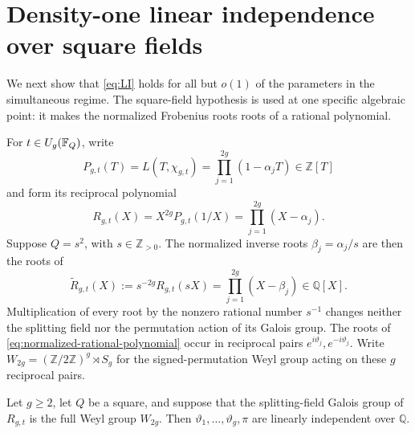 \section{Density-one linear independence over square fields}
\label{sec:linear-independence}

We next show that \eqref{eq:LI} holds for all but \(o(1)\) of the parameters
in the simultaneous regime.  The square-field hypothesis is used at one
specific algebraic point: it makes the normalized Frobenius roots roots of a
rational polynomial.

For \(t\in U_g(\mathbb F_Q)\), write
\[
 P_{g,t}(T)=L(T,\chi_{g,t})=\prod_{j=1}^{2g}(1-\alpha_jT)
 \in\mathbb Z[T]
\]
and form its reciprocal polynomial
\begin{equation}
 R_{g,t}(X)=X^{2g}P_{g,t}(1/X)=\prod_{j=1}^{2g}(X-\alpha_j).
\label{eq:reciprocal-frob-polynomial}
\end{equation}
Suppose \(Q=s^2\), with \(s\in\mathbb Z_{>0}\).  The normalized inverse roots
\(\beta_j=\alpha_j/s\) are then the roots of
\begin{equation}
 \widetilde R_{g,t}(X)
 :=s^{-2g}R_{g,t}(sX)=\prod_{j=1}^{2g}(X-\beta_j)
 \in\mathbb Q[X].
\label{eq:normalized-rational-polynomial}
\end{equation}
Multiplication of every root by the nonzero rational number \(s^{-1}\)
changes neither the splitting field nor the permutation action of its Galois
group.  The roots of \eqref{eq:normalized-rational-polynomial} occur in
reciprocal pairs \(e^{i\vartheta_j},e^{-i\vartheta_j}\).
Write
\(W_{2g}=(\mathbb Z/2\mathbb Z)^g\rtimes S_g\) for the signed-permutation
Weyl group acting on these \(g\) reciprocal pairs.

\begin{lemma}
\label{lem:maximal-galois-implies-LI}
Let \(g\geq2\), let \(Q\) be a square, and suppose that the splitting-field
Galois group of \(R_{g,t}\) is the full Weyl group \(W_{2g}\).  Then
\(\vartheta_1,\ldots,\vartheta_g,\pi\) are linearly independent over
\(\mathbb Q\).
\end{lemma}

